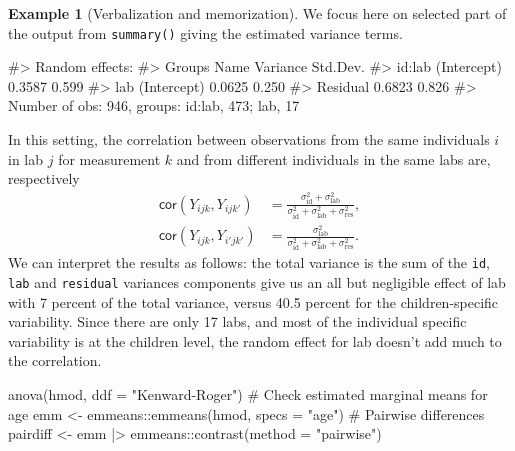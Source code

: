 \documentclass[
  11pt,
  letterpaper,
]{scrbook}
\newenvironment{Shaded}{\begin{snugshade}}{\end{snugshade}}
\newcommand{\AttributeTok}[1]{\textcolor[rgb]{0.40,0.45,0.13}{#1}}
\newcommand{\CommentTok}[1]{\textcolor[rgb]{0.37,0.37,0.37}{#1}}
\newcommand{\FunctionTok}[1]{\textcolor[rgb]{0.28,0.35,0.67}{#1}}
\newcommand{\NormalTok}[1]{\textcolor[rgb]{0.00,0.23,0.31}{#1}}
\newcommand{\OtherTok}[1]{\textcolor[rgb]{0.00,0.23,0.31}{#1}}
\newcommand{\SpecialCharTok}[1]{\textcolor[rgb]{0.37,0.37,0.37}{#1}}
\newcommand{\StringTok}[1]{\textcolor[rgb]{0.13,0.47,0.30}{#1}}
\theoremstyle{definition}
\theoremstyle{definition}
\newtheorem{example}{Example}[chapter]
\theoremstyle{remark}
\begin{document}
\begin{example}[Verbalization and
memorization]
We focus here on selected part of the output from \texttt{summary()}
giving the estimated variance terms.

\begin{Shaded}
\begin{Highlighting}[]
\CommentTok{\#\textgreater{} Random effects:}
\CommentTok{\#\textgreater{}  Groups   Name        Variance Std.Dev.}
\CommentTok{\#\textgreater{}  id:lab   (Intercept) 0.3587   0.599   }
\CommentTok{\#\textgreater{}  lab      (Intercept) 0.0625   0.250   }
\CommentTok{\#\textgreater{}  Residual             0.6823   0.826   }
\CommentTok{\#\textgreater{} Number of obs: 946, groups:  id:lab, 473; lab, 17}
\end{Highlighting}
\end{Shaded}

In this setting, the correlation between observations from the same
individuals \(i\) in lab \(j\) for measurement \(k\) and from different
individuals in the same labs are, respectively \begin{align*}
\mathsf{cor}(Y_{ijk}, Y_{ijk'}) &= \frac{\sigma^2_{\text{id}} + \sigma^2_{\text{lab}}}{\sigma^2_{\text{id}} + \sigma^2_{\text{lab}} + \sigma^2_{\text{res}}}, \\\mathsf{cor}(Y_{ijk}, Y_{i'jk'}) &= \frac{\sigma^2_{\text{lab}}}{\sigma^2_{\text{id}} + \sigma^2_{\text{lab}} + \sigma^2_{\text{res}}}.
\end{align*} We can interpret the results as follows: the total variance
is the sum of the \texttt{id}, \texttt{lab} and \texttt{residual}
variances components give us an all but negligible effect of lab with 7
percent of the total variance, versus 40.5 percent for the
children-specific variability. Since there are only 17 labs, and most of
the individual specific variability is at the children level, the random
effect for lab doesn't add much to the correlation.

\begin{Shaded}
\begin{Highlighting}[]
\FunctionTok{anova}\NormalTok{(hmod, }\AttributeTok{ddf =} \StringTok{"Kenward{-}Roger"}\NormalTok{)}
\CommentTok{\# Check estimated marginal means for age}
\NormalTok{emm }\OtherTok{\textless{}{-}}\NormalTok{ emmeans}\SpecialCharTok{::}\FunctionTok{emmeans}\NormalTok{(hmod, }\AttributeTok{specs =} \StringTok{"age"}\NormalTok{)}
\CommentTok{\# Pairwise differences}
\NormalTok{pairdiff }\OtherTok{\textless{}{-}}\NormalTok{ emm }\SpecialCharTok{|\textgreater{}} 
\NormalTok{    emmeans}\SpecialCharTok{::}\FunctionTok{contrast}\NormalTok{(}\AttributeTok{method =} \StringTok{"pairwise"}\NormalTok{)}
\end{Highlighting}
\end{Shaded}


\end{example}
\end{document}
